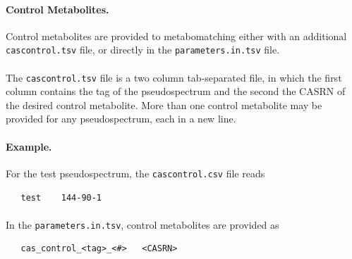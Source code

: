\documentclass[a4paper,11pt]{article}
\begin{document}
\paragraph{Control Metabolites.} Control metabolites are provided to metabomatching either with an additional \verb|cascontrol.tsv| file, or directly in the \verb|parameters.in.tsv| file.
\paragraph{} The \verb|cascontrol.tsv| file is a two column tab-separated file, in which the first column contains the tag of the pseudospectrum and the second the CASRN of the desired control metabolite. More than one control metabolite may be provided for any pseudospectrum, each in a new line.
\paragraph{Example.} For the test pseudospectrum, the \verb|cascontrol.csv| file reads
\begin{verbatim}
   test    144-90-1
\end{verbatim}
\paragraph{} In the \verb|parameters.in.tsv|, control metabolites are provided as
\begin{verbatim}
   cas_control_<tag>_<#>   <CASRN>
\end{verbatim}
\end{document}
